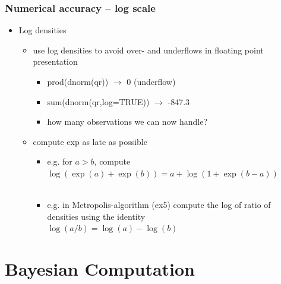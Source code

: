 \documentclass[10pt]{beamer}
\begin{document}
\begin{frame}

\frametitle{Numerical accuracy -- log scale}

  \begin{itemize}
  \item Log densities
    \begin{itemize}
    \item use log densities to avoid over- and underflows in floating
      point presentation
      \begin{itemize}
      \item {\color{uured} prod(dnorm(qr)) $\rightarrow$} {\color{red} 0 (underflow)}
      \item {\color{uured} sum(dnorm(qr,log=TRUE)) $\rightarrow$} {\color{uured} -847.3}
      \item<2-> how many observations we can now handle? %
    \end{itemize}
    \item<3-> compute exp as late as possible
      \begin{itemize}
      \item<4-> e.g. for $a>b$, compute $\log(\exp(a)+\exp(b)) = a + \log(1+\exp(b-a))$\\
        \\
      \item<7-> e.g. in Metropolis-algorithm (ex5) compute the log of ratio of densities using the identity\\
        $\log(a/b)=\log(a)-\log(b)$
    \end{itemize}
    \end{itemize}
  \end{itemize}

\end{frame}

\section{Bayesian Computation}
\end{document}

